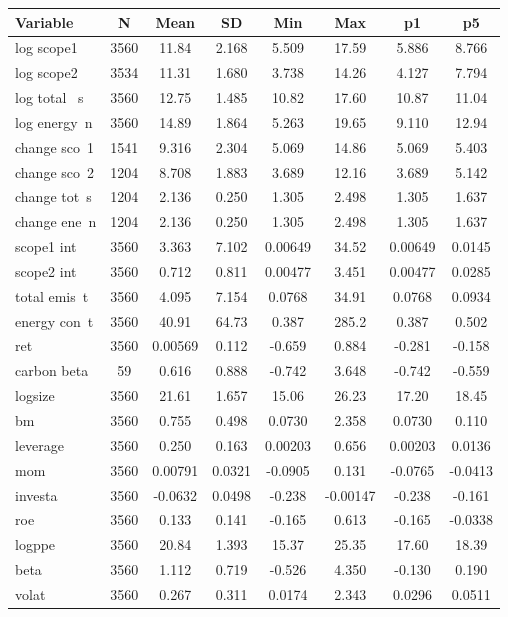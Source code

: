 \documentclass[]{article}
\begin{document}
\begin{tabular}{lccccccc} \hline
Variable & N & Mean & SD & Min & Max & p1 & p5 \\ \hline
log scope1 & 3560 & 11.84 & 2.168 & 5.509 & 17.59 & 5.886 & 8.766 \\
log scope2 & 3534 & 11.31 & 1.680 & 3.738 & 14.26 & 4.127 & 7.794 \\
log total ~s & 3560 & 12.75 & 1.485 & 10.82 & 17.60 & 10.87 & 11.04 \\
log energy~n & 3560 & 14.89 & 1.864 & 5.263 & 19.65 & 9.110 & 12.94 \\
change sco~1 & 1541 & 9.316 & 2.304 & 5.069 & 14.86 & 5.069 & 5.403 \\
change sco~2 & 1204 & 8.708 & 1.883 & 3.689 & 12.16 & 3.689 & 5.142 \\
change tot~s & 1204 & 2.136 & 0.250 & 1.305 & 2.498 & 1.305 & 1.637 \\
change ene~n & 1204 & 2.136 & 0.250 & 1.305 & 2.498 & 1.305 & 1.637 \\
scope1 int & 3560 & 3.363 & 7.102 & 0.00649 & 34.52 & 0.00649 & 0.0145 \\
scope2 int & 3560 & 0.712 & 0.811 & 0.00477 & 3.451 & 0.00477 & 0.0285 \\
total emis~t & 3560 & 4.095 & 7.154 & 0.0768 & 34.91 & 0.0768 & 0.0934 \\
energy con~t & 3560 & 40.91 & 64.73 & 0.387 & 285.2 & 0.387 & 0.502 \\
ret & 3560 & 0.00569 & 0.112 & -0.659 & 0.884 & -0.281 & -0.158 \\
carbon beta & 59 & 0.616 & 0.888 & -0.742 & 3.648 & -0.742 & -0.559 \\
logsize & 3560 & 21.61 & 1.657 & 15.06 & 26.23 & 17.20 & 18.45 \\
bm & 3560 & 0.755 & 0.498 & 0.0730 & 2.358 & 0.0730 & 0.110 \\
leverage & 3560 & 0.250 & 0.163 & 0.00203 & 0.656 & 0.00203 & 0.0136 \\
mom & 3560 & 0.00791 & 0.0321 & -0.0905 & 0.131 & -0.0765 & -0.0413 \\
investa & 3560 & -0.0632 & 0.0498 & -0.238 & -0.00147 & -0.238 & -0.161 \\
roe & 3560 & 0.133 & 0.141 & -0.165 & 0.613 & -0.165 & -0.0338 \\
logppe & 3560 & 20.84 & 1.393 & 15.37 & 25.35 & 17.60 & 18.39 \\
beta & 3560 & 1.112 & 0.719 & -0.526 & 4.350 & -0.130 & 0.190 \\
volat & 3560 & 0.267 & 0.311 & 0.0174 & 2.343 & 0.0296 & 0.0511 \\

\end{tabular}
\end{document}
